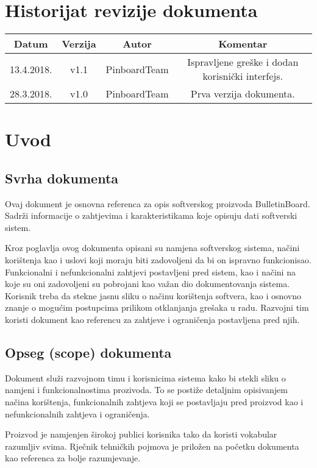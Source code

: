 \section*{Historijat revizije dokumenta}


\begin{center}
\begin{tabular}{ |c |c |c |c|} \hline
 Datum & Verzija & Autor & Komentar\\ \hline
 13.4.2018. & v1.1 & PinboardTeam  & Ispravljene greške i dodan korisnički interfejs. \\  \hline
 28.3.2018. & v1.0 & PinboardTeam  & Prva verzija dokumenta. \\  \hline
\end{tabular}
\end{center}
\newpage


\section{Uvod}
\subsection{Svrha dokumenta}
Ovaj dokument je osnovna referenca za opis softverskog proizvoda BulletinBoard. Sadrži informacije o zahtjevima i karakteristikama koje opisuju dati softverski sistem.

Kroz poglavlja ovog dokumenta opisani su namjena softverskog sistema, načini korištenja kao i uslovi koji moraju biti zadovoljeni da bi on ispravno funkcionisao. 
Funkcionalni i nefunkcionalni zahtjevi postavljeni pred sistem, kao i načini na koje su oni zadovoljeni su pobrojani kao važan dio dokumentovanja sistema.
Korisnik treba da stekne jasnu sliku o načinu korištenja softvera, kao i osnovno znanje o mogućim postupcima prilikom otklanjanja grešaka u radu. Razvojni tim koristi dokument kao referencu za zahtjeve i ograničenja postavljena pred njih.
\subsection{Opseg (scope) dokumenta}
Dokument služi razvojnom timu i korisnicima sistema kako bi stekli sliku o namjeni i funkcionalnostima prozivoda. To se postiže detaljnim opisivanjem načina korištenja, funkcionalnih zahtjeva koji se postavljaju pred proizvod kao i nefunkcionalnih zahtjeva i ograničenja. 

Proizvod je namjenjen širokoj publici korisnika tako da koristi vokabular razumljiv svima. Rječnik tehničkih pojmova je priložen na početku dokumenta kao referenca za bolje razumjevanje.

